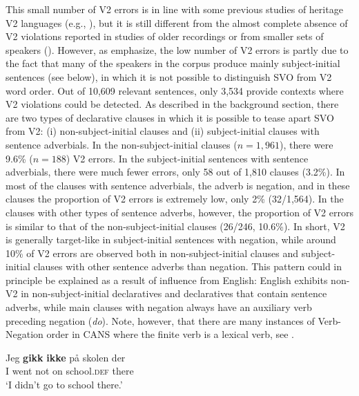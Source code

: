 \documentclass[output=paper]{langscibook}
\begin{document}
This small number of V2 errors is in line with some previous studies of heritage V2 languages (e.g., \citealt{Strømsvåg2013, LarssonJohannessen2015Incomplete}), but it is still different from the almost complete absence of V2 violations reported in studies of older recordings or from smaller sets of speakers (\citealt{Haugen1953, Hjelde1992}). However, as \citet{WestergaardEtAl2021} emphasize, the low number of V2 errors is partly due to the fact that many of the speakers in the corpus produce mainly subject\hyp initial sentences (see below), in which it is not possible to distinguish SVO from V2 word order. Out of 10,609 relevant sentences, only 3,534 provide contexts where V2 violations could be detected. As described in the background section, there are two types of declarative clauses in which it is possible to tease apart SVO from V2: (i) non\hyp subject\hyp initial clauses and (ii) subject\hyp initial clauses with sentence adverbials. In the non\hyp subject\hyp initial clauses ($n=1{,}961$), there were 9.6\% ($n=188$) V2 errors. In the subject\hyp initial sentences with sentence adverbials, there were much fewer errors, only 58 out of 1,810 clauses (3.2\%). In most of the clauses with sentence adverbials, the adverb is negation, and in these clauses the proportion of V2 errors is extremely low, only 2\% (32/1,564). In the clauses with other types of sentence adverbs, however, the proportion of V2 errors is similar to that of the non\hyp subject\hyp initial clauses (26/246, 10.6\%). In short, V2 is generally target\hyp like in subject\hyp initial sentences with negation, while around 10\% of V2 errors are observed both in non\hyp subject\hyp initial clauses and subject\hyp initial clauses with other sentence adverbs than negation. This pattern could in principle be explained as a result of influence from English: English exhibits non-V2 in non\hyp subject\hyp initial declaratives and declaratives that contain sentence adverbs, while main clauses with negation always have an auxiliary verb preceding negation (\textit{do}). Note, however, that there are many instances of Verb-Negation order in CANS where the finite verb is a lexical verb, see .

\ea%
    \label{ex:anderssen:11}
    \gll  Jeg \textbf{gikk} \textbf{ikke} på skolen der\\
          I     went        not           on  school.\textsc{def} there\\
\glt   ‘I didn’t go to school there.’
\z
\end{document}
